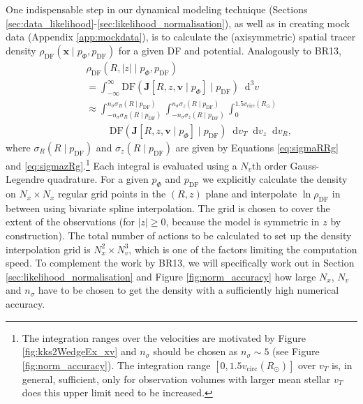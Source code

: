 \documentclass[iop,revtex4,numberedappendix,appendixfloats]{emulateapj}
\newcommand{\vect}[1]{\boldsymbol{#1}}
\newcommand*\diff{\mathop{}\!\mathrm{d}}
\newcommand*\Diff[1]{\mathop{}\!\mathrm{d^#1}}
\begin{document}
One indispensable step in our dynamical modeling technique (Sections \ref{sec:data_likelihood}-\ref{sec:likelihood_normalisation}), as well as in creating mock data (Appendix \ref{app:mockdata}), is to calculate the (axisymmetric) spatial tracer density $\rho_\text{DF}(\vect{x} \mid p_{\Phi},p_\text{DF})$ for a given DF and potential. Analogously to BR13, 
\begin{eqnarray}
&&\rho_\text{DF}(R,|z| \mid p_{\Phi},p_\text{DF}) \nonumber\\
&&= \int_{-\infty}^{\infty} \text{DF}(\vect{J}[R,z,\vect{v} \mid p_{\Phi}] \mid p_\text{DF}) \Diff3 v \nonumber\\
&&\approx \int_{-n_\sigma \sigma_R(R \mid p_\text{DF})}^{n_\sigma \sigma_R(R \mid p_\text{DF})} \int_{-n_\sigma\sigma_z(R \mid p_\text{DF})}^{n_\sigma \sigma_z(R \mid p_\text{DF})} \int_{0}^{1.5 v_\text{circ}(R_\odot)} \nonumber\\
& & \hspace{1cm} \text{DF}(\vect{J}[R,z,\vect{v} \mid p_{\Phi}] \mid p_\text{DF}) \diff v_T \diff v_z \diff v_R, \label{eq:tracerdensity}
\end{eqnarray}
where $\sigma_R(R \mid p_\text{DF})$ and $\sigma_z(R \mid p_\text{DF})$ are given by Equations \eqref{eq:sigmaRRg} and \eqref{eq:sigmazRg}.\footnote{The integration ranges over the velocities are motivated by Figure \ref{fig:kks2WedgeEx_xv} and $n_\sigma$ should be chosen as $n_\sigma \sim 5$ (see Figure \ref{fig:norm_accuracy}). The integration range $[0,1.5 v_\text{circ}(R_\odot)]$ over $v_T$ is, in general, sufficient, only for observation volumes with larger mean stellar $v_T$ does this upper limit need to be increased.} Each integral is evaluated using a $N_v$th order Gauss-Legendre quadrature. For a given $p_\Phi$ and $p_\text{DF}$ we explicitly calculate the density on $N_x \times N_x$ regular grid points in the $(R,z)$ plane and interpolate $\ln \rho_\text{DF}$ in between using bivariate spline interpolation. The grid is chosen to cover the extent of the observations (for $|z|\geq0$, because the model is symmetric in $z$ by construction). The total number of actions to be calculated to set up the density interpolation grid is $N_x^2 \times N_v^3$, which is one of the factors limiting the computation speed. To complement the work by BR13, we will specifically work out in Section \ref{sec:likelihood_normalisation} and Figure \ref{fig:norm_accuracy} how large $N_x$, $N_v$ and $n_\sigma$ have to be chosen to get the density with a sufficiently high numerical accuracy. 
\end{document}
